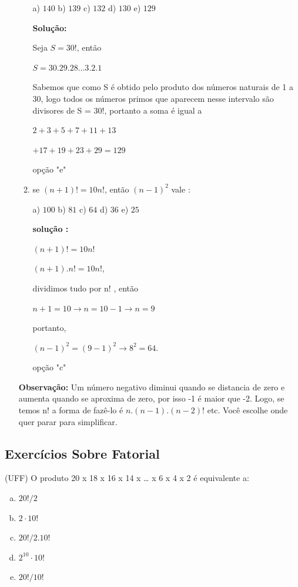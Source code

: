 \begin{multicols*}{2}
\begin{enumerate}
\begin{enumerate}
			            a) $140 $ b) $139 $ c) $132 $ d) $130 $ e) $129 $

			            \textbf{Solução:}

			            Seja {$S = 30! $}, então

			            {$ S = 30.29.28...3.2.1$}

			            Sabemos que como S é obtido pelo produto dos números naturais de 1 a 30, logo todos os números primos que aparecem nesse intervalo são divisores de S = 30!, portanto a soma  é igual a

				            {$2 + 3 + 5 + 7 + 11 + 13$}

				            {$ + 17 + 19 + 23 + 29 = 129$}

			            opção "e"

			      \item se {$(n + 1)! = 10 n!$}, então {$( n - 1 )^2 $} vale :

			            a) $100 $ b) $81 $ c) $64 $ d) $36 $ e) $25 $

			            \textbf{solução :}

			            {$(n+1)! = 10 n! $ }

			            {$(n+1) . n! = 10 n! $},

			            dividimos tudo por n! , então

			            {$n + 1 = 10 \to n = 10 - 1 \to n = 9$}

			            portanto,

			            {$(n - 1)^2 = (9 - 1)^2 \to 8^2 = 64$}.

			            opção "c"

		      \end{enumerate}

		      \textbf{Observação:} Um número negativo diminui quando se distancia de zero e aumenta quando se aproxima de zero, por isso -1 é maior que -2. Logo, se temos n! a forma de fazê-lo é {$ n . (n-1) . (n-2)!$} etc. Você escolhe onde quer parar para simplificar.

	\end{enumerate}


	\subsection*{Exercícios Sobre Fatorial}

	\setcounter{numexercicio}{0}
	\execnum  (UFF) O produto 20 x 18 x 16 x 14 x … x 6 x 4 x 2 é equivalente a:
	\begin{enumerate}[(a)]
		\item $20! / 2$
		\item $2 \cdot 10!$
		\item $20! / 2.10!$
		\item $2^{10} \cdot 10!$
		\item $20! / 10!$
	\end{enumerate}


\end{multicols*}
